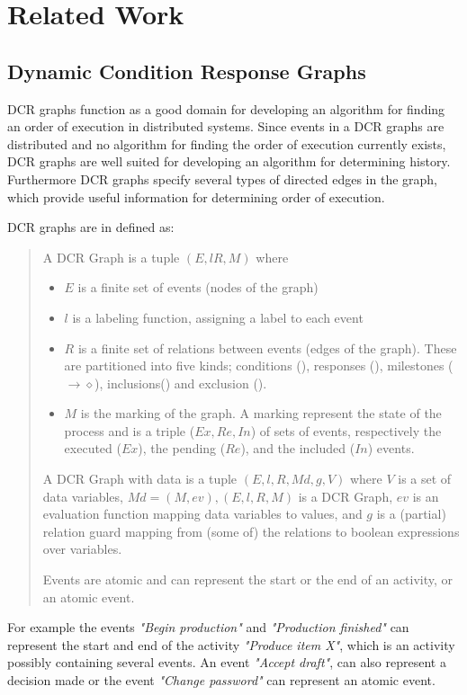 \chapter{Related Work}\label{chap:related-work}
	\section{Dynamic Condition Response Graphs}
	DCR graphs function as a good domain for developing an algorithm for finding an order of execution in distributed systems. Since events in a DCR graphs are distributed and no algorithm for finding the order of execution currently exists, DCR graphs are well suited for developing an algorithm for determining history. 
	Furthermore DCR graphs specify several types of directed edges in the graph, which provide useful information for determining order of execution.
	
	\newpar DCR graphs are in \cite{6975351} defined as: 
		\begin{quotation}	
		A DCR Graph is a tuple $(E, l R, M)$ where
		\begin{itemize}
			\item $E$ is a finite set of events (nodes of the graph)
			\item $l$ is a labeling function, assigning a label to each event
			\item $R$ is a finite set of relations between events (edges of the graph). These are partitioned into five kinds; conditions (\condition), responses (\response), milestones ($\rightarrow\!\!\!\diamond$), inclusions(\inclusion) and exclusion (\exclusion).
			\item $M$ is the marking of the graph. A marking represent the state of the process and is a triple ($Ex,Re,In$) of sets of events, respectively the executed ($Ex$), the pending ($Re$), and the included ($In$) events.
		\end{itemize}
		A DCR Graph with data is a tuple $(E,l,R,Md,g,V)$ where $V$ is a set of data variables, $Md = (M,ev), (E,l,R,M)$ is a DCR Graph, $ev$ is an evaluation function mapping data variables to values, and $g$ is a (partial) relation guard mapping from (some of) the relations to boolean expressions over variables.
		
		Events are atomic and can represent the start or the end of an activity, or an atomic event. 
	\end{quotation}
	
	\newpar For example the events \textit{"Begin production"} and \textit{"Production finished"} can represent the start and end of the activity \textit{"Produce item X"}, which is an activity possibly containing several events. An event \textit{"Accept draft"}, can also represent a decision made or the event \textit{"Change password"} can represent an atomic event.
	
